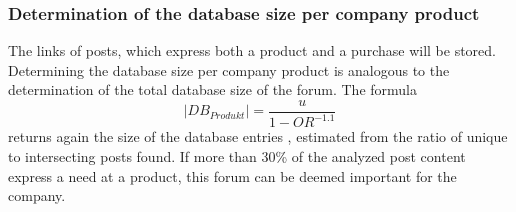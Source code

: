 \subsubsection{Determination of the database size per company product}
The links of posts, which express both a product and a purchase will be stored. Determining the database size per company product is analogous to the determination of the total database size of the forum. The formula \[|DB_{Produkt}| = \frac{u}{1-OR^{-1.1}}\] \cite{lu2008efficient} returns again the size of the database entries , estimated from the ratio of unique to intersecting posts found.
If more than 30\% of the analyzed post content express a need at a product, this forum can be deemed important for the company.

\newpage